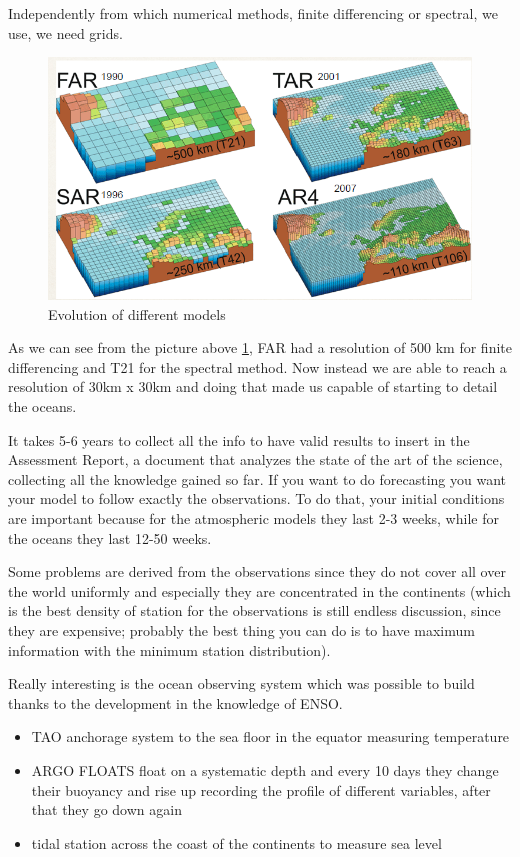 Independently from which numerical methods, finite differencing or spectral, we use, we need grids.
\begin{figure}[htp!]
	\centering
	\includegraphics[width=0.4\linewidth]{upload/Screenshot 2024-11-20 213227.png}
	\caption{Evolution of different models}
	\label{fig:grids evolution}

\end{figure}
As we can see from the picture above \ref{fig:grids evolution}, FAR had a resolution of 500 km for finite differencing and T21 for the spectral method. Now instead we are able to reach a resolution of 30km x 30km and doing that made us capable of starting to detail the oceans.

It takes 5-6 years to collect all the info to have valid results to insert in the Assessment Report, a document that analyzes the state of the art of the science, collecting all the knowledge gained so far.
If you want to do forecasting you want your model to follow exactly the observations. To do that, your initial conditions are important because for the atmospheric models they last 2-3 weeks, while for the oceans they last 12-50 weeks.

Some problems are derived from the observations since they do not cover all over the world uniformly and especially they are concentrated in the continents (which is the best density of station for the observations is still endless discussion, since they are expensive; probably the best thing you can do is to have maximum information with the minimum station distribution).

Really interesting is the ocean observing system which was possible to build thanks to the development in the knowledge of ENSO.
\begin{itemize}
	\item TAO anchorage system to the sea floor in the equator measuring temperature
	\item  ARGO FLOATS float on a systematic depth and every 10 days they change their buoyancy and rise up recording the profile of different variables, after that they go down again
	\item tidal station across the coast of the continents to measure sea level
\end{itemize}

